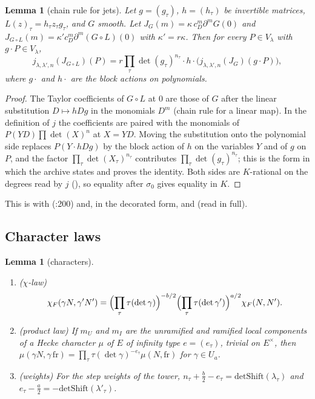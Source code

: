 \documentclass[11pt]{article}
\newtheorem{lemma}[theorem]{Lemma}
\theoremstyle{definition}
\theoremstyle{remark}
\begin{document}
\begin{lemma}[chain rule for jets]\label{lem:J}
Let $g=(g_\tau)$, $h=(h_\tau)$ be invertible matrices, $L(z)_\tau=h_\tau z_\tau g_\tau$, and $G$ smooth. Let $J_G(m)=\kappa\,c_D^m\partial^mG(0)$ and $J_{G\circ L}(m)=\kappa'c_D^m\partial^m(G\circ L)(0)$ with $\kappa'=r\kappa$. Then for every $P\in V_\lambda$ with $g\cdot P\in V_\lambda$,
\[
j_{\lambda,\lambda',n}(J_{G\circ L})(P)=r\prod_\tau\det(g_\tau)^{n_\tau}\cdot h\cdot\bigl(j_{\lambda,\lambda',n}(J_G)(g\cdot P)\bigr),
\]
where $g\cdot$ and $h\cdot$ are the block actions on polynomials.
\end{lemma}

\begin{proof}
The Taylor coefficients of $G\circ L$ at $0$ are those of $G$ after the linear substitution $D\mapsto hDg$ in the monomials $D^m$ (chain rule for a linear map). In the definition of $j$ the coefficients are paired with the monomials of $P(YD)\prod\det(X)^{n}$ at $X=YD$. Moving the substitution onto the polynomial side replaces $P(Y\cdot hDg)$ by the block action of $h$ on the variables $Y$ and of $g$ on $P$, and the factor $\prod_\tau\det(X_\tau)^{n_\tau}$ contributes $\prod_\tau\det(g_\tau)^{n_\tau}$; this is the form in which the archive states and proves the identity. Both sides are $K$-rational on the degrees read by $j$ (), so equality after $\sigma_0$ gives equality in $K$.
\end{proof}

\noindent This is  with  (:200) and, in the decorated form,  and  (read in full).

\subsection{Character laws}

\begin{lemma}[characters]\label{lem:C}
\begin{enumerate}[label=(\alph*),itemsep=1pt]
\item ($\chi$-law) \[\chi_F(\gamma N,\gamma'N')=\Bigl(\prod_\tau\tau(\det\gamma)\Bigr)^{-b/2}\Bigl(\prod_\tau\tau(\det\gamma')\Bigr)^{a/2}\chi_F(N,N').\]
\item (product law) If $m_U$ and $m_I$ are the unramified and ramified local components of a Hecke character $\mu$ of $E$ of infinity type $e=(e_\tau)$, trivial on $E^\times$, then $\mu(\gamma N,\gamma\,\mathrm{fr})=\prod_\tau\tau(\det\gamma)^{-e_\tau}\mu(N,\mathrm{fr})$ for $\gamma\in U_a$.
\item (weights) For the step weights of the tower, $n_\tau+\tfrac b2-e_\tau=\mathrm{detShift}(\lambda_\tau)$ and $e_\tau-\tfrac a2=-\mathrm{detShift}(\lambda'_\tau)$.
\end{enumerate}
\end{lemma}
\end{document}
